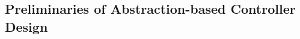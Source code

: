 \begin{comment}
We will use the notation $\mathbf{1}$ to denote the function $\mathbb{R}_{\geq 0}\to \set{1}$.

\subsection{Translation of Prob.~\ref{prob:tracking_with_time} to an LTL Formula}
First, we translate the tracking problem given in Prob.~\ref{prob:tracking_with_time} for the system $\Sigma=(X,U,W,f)$ to an equivalent controller synthesis problem for an LTL specification $\varphi$ for a different system $\widetilde{\Sigma}$.
Essentially, $\widetilde{\Sigma}$ is obtained by appending the state of the system $\Sigma$ with a variable that varies at the same rate as time.
Formally, the system $\widetilde{\Sigma}$ is defined as the tuple $(\widetilde{X}, U, W, \widetilde{f})$ where $\widetilde{X}\coloneqq X\cup \set{s}$, $s$ being a variable taking values in non-negative reals, and $\widetilde{f} \equiv f \oplus \mathbf{1}$. 
Note that disturbance does not affect the appended state variable. 

The specification $\varphi$ is obtained as in the following:
First, define the set $P = \Set{(x,k)\in \sem{\widetilde{X}} | d_{{X}}(x, x_{k_\nom}) < \varepsilon}$. 
We define $\varphi\coloneqq \square P$:
It can be shown that if a feedback controller $C$ of $\Sigma_\tau$ ensures that all the closed loop behaviors of $C\parallel \Sigma_\tau$ satisfies the specification $\varphi$, then $C$ is a tracking controller for the given nominal trajectory.
\KM{TODO: perhaps it's good idea to prove this formally?}
\end{comment}

\subsection{Preliminaries of Abstraction-based Controller Design}

